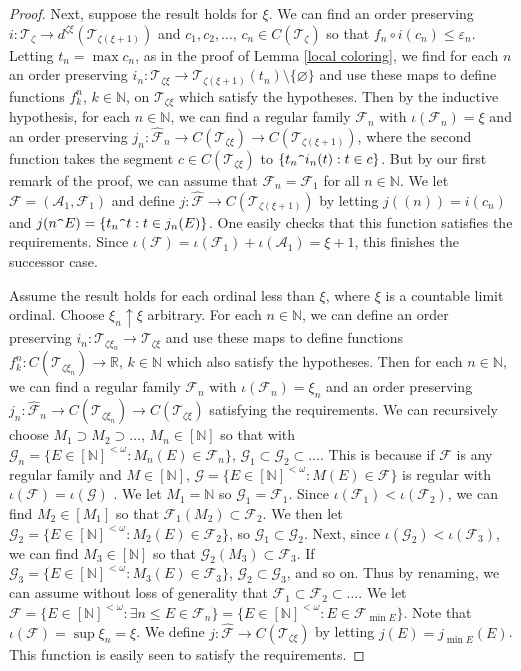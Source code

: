 \documentclass[12pt]{amsart}
\theoremstyle{definition}
\newcommand{\fin}{[\mathbb{N}]^{<\omega}}
\newcommand{\infin}{[\mathbb{N}]}
\newcommand{\rr}{\mathbb{R}}
\newcommand{\nn}{\mathbb{N}}
\newcommand{\aaa}{\mathcal{A}}
\newcommand{\fff}{\mathcal{F}}
\newcommand{\gggg}{\mathcal{G}}
\newcommand{\ttt}{\mathcal{T}}
\begin{document}
\begin{proof}
Next, suppose the result holds for $\xi$.  We can find an order preserving $i:\ttt_\zeta\to d^{\zeta\xi}(\ttt_{\zeta(\xi+1)})$ and $c_1, c_2, \ldots$, $c_n\in C(\ttt_\zeta)$ so that $f_n\circ i(c_n)\leqslant \varepsilon_n$.   Letting $t_n=\max  c_n$, as in the proof of Lemma \ref{local coloring}, we find for each $n$ an order preserving $i_n:\ttt_{\zeta\xi}\to \ttt_{\zeta(\xi+1)}(t_n)\setminus \{\varnothing\}$ and use these maps to define functions $f^n_k$, $k\in \nn$, on $\ttt_{\zeta\xi}$ which satisfy the hypotheses.  Then by the inductive hypothesis, for each $n\in \nn$, we can find a regular family $\fff_n$ with $\iota(\fff_n)= \xi$ and an order preserving $j_n:\widehat{\fff}_n\to C(\ttt_{\zeta\xi})\to C(\ttt_{\zeta(\xi+1)})$, where the second function takes the segment $c\in C(\ttt_{\zeta\xi})$ to $\{t_n\verb!^!i_n(t):t\in c\}$.  But by our first remark of the proof, we can assume that $\fff_n= \fff_1$ for all $n\in \nn$.  We let $\fff= (\aaa_1, \fff_1)$ and define $j:\widehat{\fff}\to C(\ttt_{\zeta(\xi+1)})$ by letting $j((n))=i(c_n)$ and $j(n\verb!^!E)= \{t_n\verb!^!t: t\in j_n(E)\}$.  One easily checks that this function satisfies the requirements.  Since $\iota(\fff)=\iota(\fff_1)+\iota(\aaa_1)=\xi+1$, this finishes the successor case.  

Assume the result holds for each ordinal less than $\xi$, where $\xi$ is a countable limit ordinal.  Choose $\xi_n\uparrow \xi$ arbitrary.  For each $n\in \nn$, we can define an order preserving $i_n:\ttt_{\zeta\xi_n}\to \ttt_{\zeta\xi}$ and use these maps to define functions $f^n_k:C(\ttt_{\zeta\xi_n})\to \rr$, $k\in \nn$ which also satisfy the hypotheses.  Then for each $n\in \nn$, we can find a regular family $\fff_n$ with $\iota(\fff_n)=\xi_n$ and an order preserving $j_n:\widehat{\fff}_n\to C(\ttt_{\zeta\xi_n})\to C(\ttt_{\zeta\xi})$ satisfying the requirements.  We can recursively choose $M_1\supset M_2\supset\ldots$, $M_n\in \infin$ so that with $\gggg_n=\{E\in \fin: M_n(E)\in \fff_n\}$, $\gggg_1\subset \gggg_2\subset \ldots$.  This is because if $\fff$ is any regular family and $M\in \infin$,  $\gggg=\{E\in \fin: M(E)\in \fff\}$ is regular with $\iota(\fff)=\iota(\gggg)$ \cite{Causey}.  We let $M_1=\nn$ so $\gggg_1= \fff_1$.  Since $\iota(\fff_1)<\iota(\fff_2)$, we can find $M_2\in [M_1]$ so that $\fff_1(M_2)\subset \fff_2$.  We then let $\gggg_2= \{E\in \fin: M_2(E)\in \fff_2\}$, so $\gggg_1\subset \gggg_2$.  Next, since $ \iota(\gggg_2)< \iota(\fff_3)$, we can find $M_3\in \infin$ so that $\gggg_2(M_3)\subset \fff_3$.  If $\gggg_3=\{E\in \fin: M_3(E)\in \fff_3\}$, $\gggg_2\subset \gggg_3$, and so on.  Thus by renaming, we can assume without loss of generality that $\fff_1\subset \fff_2\subset \ldots$.  We let $\fff=\{E\in \fin: \exists n\leqslant E\in \fff_n\}=\{E\in \fin: E\in \fff_{\min E}\}$.  Note that $\iota(\fff)=\sup \xi_n=\xi$.  We define $j:\widehat{\fff}\to C(\ttt_{\zeta\xi})$ by letting $j(E)= j_{\min E}(E)$.  This function is easily seen to satisfy the requirements.  





\end{proof}
\end{document}
